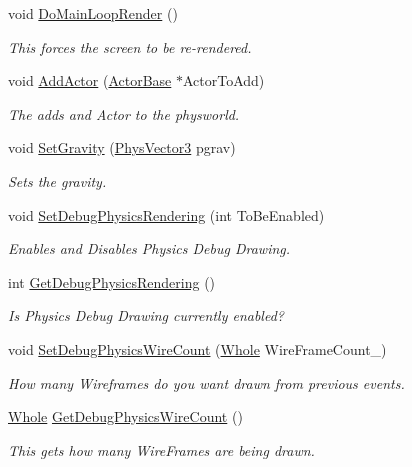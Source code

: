 \begin{DoxyCompactItemize}
void \hyperlink{classphys_1_1World_a34133dd084f575a51209458dbe9ecdac}{DoMainLoopRender} ()
\begin{DoxyCompactList}\small\item\em This forces the screen to be re-\/rendered. \item\end{DoxyCompactList}\item 
void \hyperlink{classphys_1_1World_a0fec41ef68b7bb1443aab927f8277a81}{AddActor} (\hyperlink{classphys_1_1ActorBase}{ActorBase} $\ast$ActorToAdd)
\begin{DoxyCompactList}\small\item\em The adds and Actor to the physworld. \item\end{DoxyCompactList}\item 
void \hyperlink{classphys_1_1World_a3779f811ca8a394a20fc2d92823b5f93}{SetGravity} (\hyperlink{classPhysVector3}{PhysVector3} pgrav)
\begin{DoxyCompactList}\small\item\em Sets the gravity. \item\end{DoxyCompactList}\item 
void \hyperlink{classphys_1_1World_a9fbd112d2677aa948301287d541b64bb}{SetDebugPhysicsRendering} (int ToBeEnabled)
\begin{DoxyCompactList}\small\item\em Enables and Disables Physics Debug Drawing. \item\end{DoxyCompactList}\item 
int \hyperlink{classphys_1_1World_a92070d16eb81866b4393f0ed96fbcbbc}{GetDebugPhysicsRendering} ()
\begin{DoxyCompactList}\small\item\em Is Physics Debug Drawing currently enabled? \item\end{DoxyCompactList}\item 
void \hyperlink{classphys_1_1World_a6fa4d1e58a78ba0403af1c003fd321d9}{SetDebugPhysicsWireCount} (\hyperlink{namespacephys_a460f6bc24c8dd347b05e0366ae34f34a}{Whole} WireFrameCount\_\-)
\begin{DoxyCompactList}\small\item\em How many Wireframes do you want drawn from previous events. \item\end{DoxyCompactList}\item 
\hyperlink{namespacephys_a460f6bc24c8dd347b05e0366ae34f34a}{Whole} \hyperlink{classphys_1_1World_a1031d596580ac1a8d3593b5be9b49091}{GetDebugPhysicsWireCount} ()
\begin{DoxyCompactList}\small\item\em This gets how many WireFrames are being drawn. \item\end{DoxyCompactList}\end{DoxyCompactItemize}
